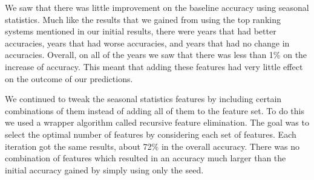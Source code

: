 We saw that there was little improvement on the baseline accuracy using seasonal statistics. 
Much like the results that we gained from using the top ranking systems mentioned in our initial results, there were years that had better accuracies, years that had worse accuracies, and years that had no change in accuracies. 
Overall, on all of the years we saw that there was less than 1\% on the increase of accuracy. 
This meant that adding these features had very little effect on the outcome of our predictions. 

We continued to tweak the seasonal statistics features by including certain combinations of them instead of adding all of them to the feature set. 
To do this we used a wrapper algorithm called recursive feature elimination. 
The goal was to select the optimal number of features by considering each set of features. 
Each iteration got the same results, about 72\% in the overall accuracy. 
There was no combination of features which resulted in an accuracy much larger than the initial accuracy gained by simply using only the seed.

